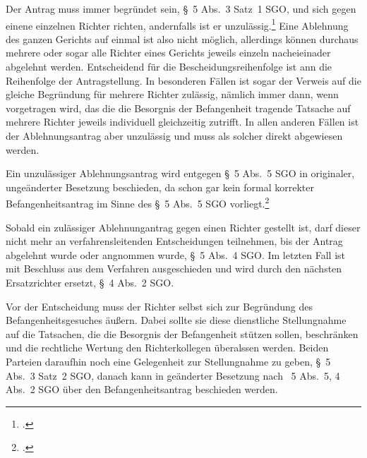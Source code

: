 Der Antrag muss immer begründet sein, \S~5 Abs.~3 Satz~1 SGO, und sich gegen einene einzelnen Richter richten, andernfalls ist er unzulässig.\footnote{\cites[S.~1]{BSG201305062BefangenheitI}{BGHIIARZ101}.}
Eine Ablehnung des ganzen Gerichts auf einmal ist also nicht möglich, allerdings können durchaus mehrere oder sogar alle Richter eines Gerichts jeweils einzeln nacheieinader abgelehnt werden.
Entscheidend für die Bescheidungsreihenfolge ist ann die Reihenfolge der Antragstellung.
In besonderen Fällen ist sogar der Verweis auf die gleiche Begründung für mehrere Richter zulässig, nämlich immer dann, wenn vorgetragen wird, das die die Besorgnis der Befangenheit tragende Tatsache auf mehrere Richter jeweils individuell gleichzeitig zutrifft.
In allen anderen Fällen ist der Ablehnungsantrag aber unzulässig und muss als solcher direkt abgewiesen werden.

Ein unzulässiger Ablehnungsantrag wird entgegen \S~5 Abs.~5 SGO in originaler, ungeänderter Besetzung beschieden, da schon gar kein formal korrekter Befangenheitsantrag im Sinne des \S~5 Abs.~5 SGO vorliegt.\footnote{\cites[S.~1]{BSG201305062BefangenheitI}{BSG201305062BefangenheitII}.}

Sobald ein zulässiger Ablehnungantrag gegen einen Richter gestellt ist, darf dieser nicht mehr an verfahrensleitenden Entscheidungen teilnehmen, bis der Antrag abgelehnt wurde oder angnommen wurde, \S~5 Abs.~4 SGO.
Im letzten Fall ist mit Beschluss aus dem Verfahren ausgeschieden und wird durch den nächsten Ersatzrichter ersetzt, \S~4 Abs.~2 SGO.

Vor der Entscheidung muss der Richter selbst sich zur Begründung des Befangenheitsgesuches äußern.
Dabei sollte sie diese dienstliche Stellungnahme auf die Tatsachen, die die Besorgnis der Befangenheit stützen sollen, beschränken und die rechtliche Wertung den Richterkollegen überalssen werden.
Beiden Parteien daraufhin noch eine Gelegenheit zur Stellungnahme zu geben, \S~5 Abs.~3 Satz~2 SGO, danach kann in geänderter Besetzung nach \SSS~5 Abs.~5, 4 Abs.~2 SGO über den Befangenheitsantrag beschieden werden.

